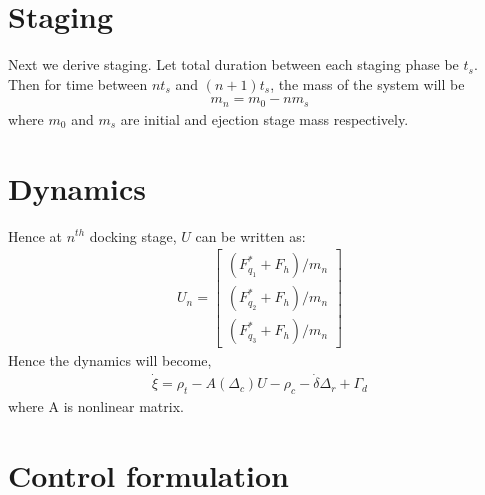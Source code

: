 \documentclass[]{article}
\theoremstyle{remark}
\theoremstyle{definition}
\begin{document}
	\section{Staging}
	Next we derive staging. Let total duration between each staging phase be $t_s$. Then for time between $nt_s$ and $(n+1)t_s$, the mass of the system will be 
	\begin{align}
		m_n = m_0 - nm_s 
	\end{align}
	where $m_0$ and $m_s$ are initial and ejection stage mass respectively.
	\section{Dynamics}
	Hence at $n^{th}$ docking stage, $U$ can be written as:
	\begin{align}
		U_n = \begin{bmatrix}
			(F^*_{q_1}+F_h)/m_n \\ (F^*_{q_2}+F_h)/m_n \\
			(F^*_{q_3}+F_h)/m_n
		\end{bmatrix}
	\end{align}
	Hence the dynamics will become,
	\begin{align}
		\dot \xi =  \rho_t -  A(\Delta_c)U-\rho_c - \dot \delta \Delta_r + \Gamma_d   
	\end{align}
	where A is nonlinear matrix. 
	\section{Control formulation}
\end{document}
